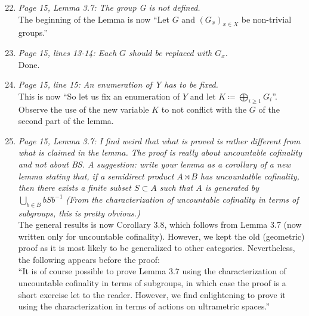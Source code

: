 \documentclass[english,a4paper]{article}
\begin{document}
\begin{enumerate}
%
\setcounter{enumi}{21}
%
\item\textit{Page 15, Lemma 3.7: The group G is not defined.}\\
The beginning of the Lemma is now ``Let $G$ and $(G_x)_{x\in X}$ be non-trivial groups.''
%
\item\textit{Page 15, lines 13-14: Each $G$ should be replaced with $G_x$.}\\
Done.
%
\item\textit{Page 15, line 15: An enumeration of Y has to be fixed.}\\
This is now ``So let us fix an enumeration of $Y$ and let $K\coloneqq \bigoplus_{i\geq 1}G_i$''. Observe the use of the new variable $K$ to not conflict with the $G$ of the second part of the lemma.
%
\item\textit{Page 15, Lemma 3.7: I find weird that what is proved is rather different from what is claimed in the lemma. The proof is really about uncountable cofinality and not about BS.
A suggestion: write your lemma as a corollary of a new lemma stating that, if a semidirect product $A\rtimes B$ has uncountatble cofinality, then there exists a finite subset $S\subset A$ such that $A$ is generated by $\bigcup_{b\in B}bSb^{-1}$ (From the characterization of uncountable cofinality in terms of subgroups, this is pretty obvious.)}\\
The general results is now Corollary 3.8, which follows from Lemma 3.7 (now written only for uncountable cofinality). However, we kept the old (geometric) proof as it is most likely to be generalized to other categories. Nevertheless, the following appears before the proof:\\
``It is of course possible to prove Lemma 3.7 using the characterization of uncountable cofinality in terms of subgroups, in which case the proof is a short exercise let to the reader. However, we find enlightening to prove it using the characterization in terms of actions on ultrametric spaces.''


\end{enumerate}
\end{document}
